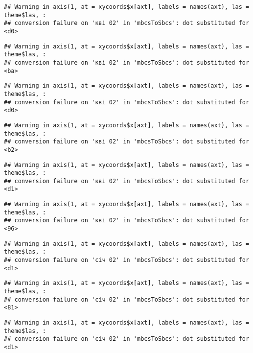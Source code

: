 \documentclass[]{article}
\begin{document}
\begin{verbatim}
## Warning in axis(1, at = xycoords$x[axt], labels = names(axt), las = theme$las, :
## conversion failure on 'кві 02' in 'mbcsToSbcs': dot substituted for <d0>
\end{verbatim}

\begin{verbatim}
## Warning in axis(1, at = xycoords$x[axt], labels = names(axt), las = theme$las, :
## conversion failure on 'кві 02' in 'mbcsToSbcs': dot substituted for <ba>
\end{verbatim}

\begin{verbatim}
## Warning in axis(1, at = xycoords$x[axt], labels = names(axt), las = theme$las, :
## conversion failure on 'кві 02' in 'mbcsToSbcs': dot substituted for <d0>
\end{verbatim}

\begin{verbatim}
## Warning in axis(1, at = xycoords$x[axt], labels = names(axt), las = theme$las, :
## conversion failure on 'кві 02' in 'mbcsToSbcs': dot substituted for <b2>
\end{verbatim}

\begin{verbatim}
## Warning in axis(1, at = xycoords$x[axt], labels = names(axt), las = theme$las, :
## conversion failure on 'кві 02' in 'mbcsToSbcs': dot substituted for <d1>
\end{verbatim}

\begin{verbatim}
## Warning in axis(1, at = xycoords$x[axt], labels = names(axt), las = theme$las, :
## conversion failure on 'кві 02' in 'mbcsToSbcs': dot substituted for <96>
\end{verbatim}

\begin{verbatim}
## Warning in axis(1, at = xycoords$x[axt], labels = names(axt), las = theme$las, :
## conversion failure on 'січ 02' in 'mbcsToSbcs': dot substituted for <d1>
\end{verbatim}

\begin{verbatim}
## Warning in axis(1, at = xycoords$x[axt], labels = names(axt), las = theme$las, :
## conversion failure on 'січ 02' in 'mbcsToSbcs': dot substituted for <81>
\end{verbatim}

\begin{verbatim}
## Warning in axis(1, at = xycoords$x[axt], labels = names(axt), las = theme$las, :
## conversion failure on 'січ 02' in 'mbcsToSbcs': dot substituted for <d1>
\end{verbatim}
\end{document}
